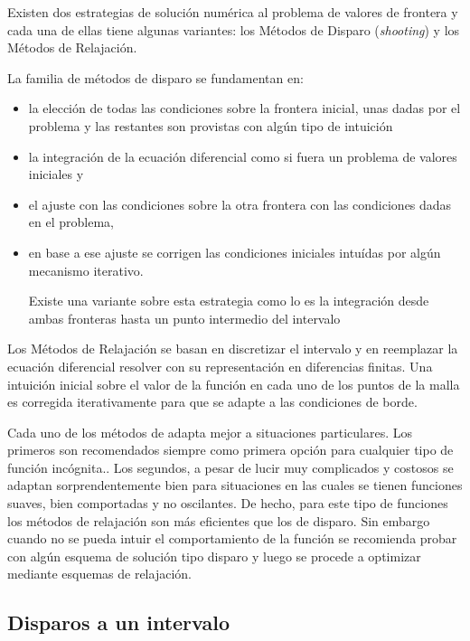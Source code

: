 \documentclass[spanish,titlepage,11pt]{article}
\begin{document}
Existen dos estrategias de soluci\'{o}n num\'{e}rica al problema de valores de
frontera y cada una de ellas tiene algunas variantes: los M\'{e}todos de
Disparo (\textit{shooting}) y los M\'{e}todos de Relajaci\'{o}n.

La familia de m\'{e}todos de disparo se fundamentan en:

\begin{itemize}
\item  la elecci\'{o}n de todas las condiciones sobre la frontera inicial,
unas dadas por el problema y las restantes son provistas con alg\'{u}n tipo de
intuici\'{o}n

\item  la integraci\'{o}n de la ecuaci\'{o}n diferencial como si fuera un
problema de valores iniciales y

\item  el ajuste con las condiciones sobre la otra frontera con las
condiciones dadas en el problema,

\item  en base a ese ajuste se corrigen las condiciones iniciales intu\'{i}das
por alg\'{u}n mecanismo iterativo.

Existe una variante sobre esta estrategia como lo es la integraci\'{o}n desde
ambas fronteras hasta un punto intermedio del intervalo
\end{itemize}

Los M\'{e}todos de Relajaci\'{o}n se basan en discretizar el intervalo y en
reemplazar la ecuaci\'{o}n diferencial resolver con su representaci\'{o}n en
diferencias finitas. Una intuici\'{o}n inicial sobre el valor de la
funci\'{o}n en cada uno de los puntos de la malla es corregida iterativamente
para que se adapte a las condiciones de borde.

Cada uno de los m\'{e}todos de adapta mejor a situaciones particulares. Los
primeros son recomendados siempre como primera opci\'{o}n para cualquier tipo
de funci\'{o}n inc\'{o}gnita.. Los segundos, a pesar de lucir muy complicados
y costosos se adaptan sorprendentemente bien para situaciones en las cuales se
tienen funciones suaves, bien comportadas y no oscilantes. De hecho, para este
tipo de funciones los m\'{e}todos de relajaci\'{o}n son m\'{a}s eficientes que
los de disparo. Sin embargo cuando no se pueda intuir el comportamiento de la
funci\'{o}n se recomienda probar con alg\'{u}n esquema de soluci\'{o}n tipo
disparo y luego se procede a optimizar mediante esquemas de relajaci\'{o}n.

\subsection{Disparos a un intervalo}
\end{document}
